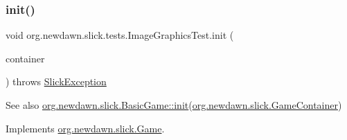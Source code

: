 \subsubsection{\texorpdfstring{init()}{init()}}
{\footnotesize\ttfamily void org.\+newdawn.\+slick.\+tests.\+Image\+Graphics\+Test.\+init (\begin{DoxyParamCaption}\item[{\mbox{\hyperlink{classorg_1_1newdawn_1_1slick_1_1_game_container}{Game\+Container}}}]{container }\end{DoxyParamCaption}) throws \mbox{\hyperlink{classorg_1_1newdawn_1_1slick_1_1_slick_exception}{Slick\+Exception}}\hspace{0.3cm}{\ttfamily [inline]}}

\begin{DoxySeeAlso}{See also}
\mbox{\hyperlink{classorg_1_1newdawn_1_1slick_1_1_basic_game_a8af0900217e4d389249f71367b22d114}{org.\+newdawn.\+slick.\+Basic\+Game\+::init}}(\mbox{\hyperlink{classorg_1_1newdawn_1_1slick_1_1_game_container}{org.\+newdawn.\+slick.\+Game\+Container}}) 
\end{DoxySeeAlso}


Implements \mbox{\hyperlink{interfaceorg_1_1newdawn_1_1slick_1_1_game_ad2dd6affab08bb8fdb5fab0815957b7a}{org.\+newdawn.\+slick.\+Game}}.


